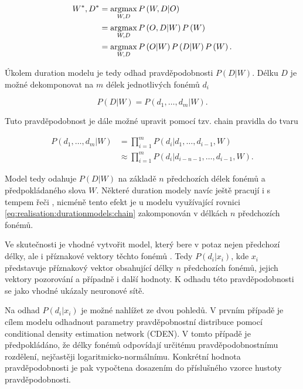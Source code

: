 \begin{align}
  W^{*}, D^{*} &= \operatorname*{argmax}_{W, D} P\left(W, D| O\right) \nonumber  \\
          &= \operatorname*{argmax}_{W, D} P\left(O, D| W\right)P\left(W\right) \nonumber  \\
          &= \operatorname*{argmax}_{W, D} P\left(O|W\right)P\left(D|W\right)P\left(W\right).
  \label{eq:realisation:durationmodels:assumtion}
\end{align}

\noindent Úkolem duration modelu je tedy odhad pravděpodobnosti $P\left(D|W\right)$. Délku $D$ je možné dekomponovat na $m$ délek jednotlivých fonémů $d_{i}$

\begin{equation}
  P\left(D | W\right) = P\left(d_{1}, \dots, d_{m}|W\right).
  \label{eq:realisation:durationmodels:decomposition}
\end{equation}

\noindent Tuto pravděpodobnost je dále možné upravit pomocí tzv. chain pravidla do tvaru

\begin{align}
  P\left(d_{1}, \dots, d_{m} | W\right) &= \prod_{i=1}^{m} P\left(d_{i} | d_{1}, \dots, d_{i-1}, W\right) \nonumber \\
        &\approx \prod_{i=1}^{m} P\left(d_{i} | d_{i-n-1}, \dots, d_{i-1}, W\right).
  \label{eq:realisation:durationmodels:chain}
\end{align}

\noindent Model tedy odahuje $P\left(D|W\right)$ na základě $n$ předchozích délek fonémů a předpokládaného slova $W$. Některé duration modely navíc ještě pracují i s tempem řeči \cite{Pylkkonen2004}, nicméně tento efekt je u modelu využívající rovnici \ref{eq:realisation:durationmodels:chain} zakomponován v délkách $n$ předchozích fonémů.

Ve skutečnosti je vhodné vytvořit model, který bere v potaz nejen předchozí délky, ale i příznakové vektory těchto fonémů \cite{Alumae2014}. Tedy $P\left(d_{i}|x_{i}\right)$, kde $x_{i}$ představuje příznakový vektor obsahující délky $n$ předchozích fonémů, jejich vektory pozorování a případně i další hodnoty. K odhadu této pravděpodobnosti se jako vhodné ukázaly neuronové sítě. \cite{Alumae2014} \cite{Hadian2017}

Na odhad $P\left(d_{i}|x_{i}\right)$ je možné nahlížet ze dvou pohledů. V prvním případě je cílem modelu odhadnout parametry pravděpobnostní distribuce pomocí conditional density estimation network (CDEN). \cite{Alumae2014} V tomto případě je předpokládáno, že délky fonémů odpovídají určitému pravděpodobnostnímu rozdělení, nejčastěji logaritmicko-normálnímu. Konkrétní hodnota pravděpodobnosti je pak vypočtena dosazením do příslušného vzorce hustoty pravděpodobnosti.

